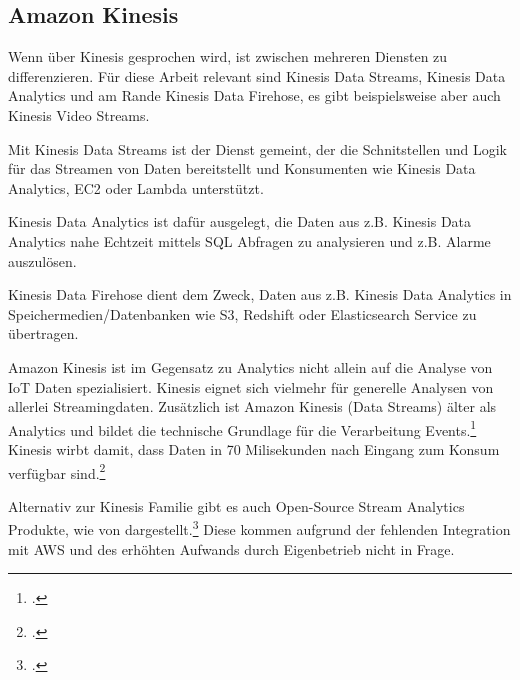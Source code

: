 \subsection{Amazon Kinesis}


Wenn über Kinesis gesprochen wird, ist zwischen mehreren Diensten zu differenzieren. Für diese Arbeit relevant sind Kinesis Data Streams, Kinesis Data Analytics und am Rande Kinesis Data Firehose, es gibt beispielsweise aber auch Kinesis Video Streams.

Mit Kinesis Data Streams ist der Dienst gemeint, der die Schnitstellen und Logik für das Streamen von Daten bereitstellt und Konsumenten wie Kinesis Data Analytics, \ac{EC2} oder Lambda unterstützt. 

Kinesis Data Analytics ist dafür ausgelegt, die Daten aus z.B. Kinesis Data Analytics nahe Echtzeit mittels \ac{SQL} Abfragen zu analysieren und z.B. Alarme auszulösen.

Kinesis Data Firehose dient dem Zweck, Daten aus z.B. Kinesis Data Analytics in Speichermedien/Datenbanken wie \ac{S3}, Redshift oder Elasticsearch Service zu übertragen.

Amazon Kinesis ist im Gegensatz zu \AWSIOT Analytics nicht allein auf die Analyse von \ac{IoT} Daten spezialisiert. Kinesis eignet sich vielmehr für generelle Analysen von allerlei Streamingdaten. Zusätzlich ist Amazon Kinesis (Data Streams) älter als \AWSIOT Analytics und bildet die technische Grundlage für die Verarbeitung \AWSIOT Events.\footcite[Vgl.][]{Pogosova.28.05.2020} Kinesis wirbt damit, dass Daten in 70 Milisekunden nach Eingang zum Konsum verfügbar sind.\footcite[Vgl.][]{AmazonWebServicesInc..o.J.af}

Alternativ zur Kinesis Familie gibt es auch Open-Source Stream Analytics Produkte, wie von \citeauthor{Singh.2016} dargestellt.\footcite[Vgl.][]{Singh.2016} Diese kommen aufgrund der fehlenden Integration mit \ac{AWS} und des erhöhten Aufwands durch Eigenbetrieb nicht in Frage.

